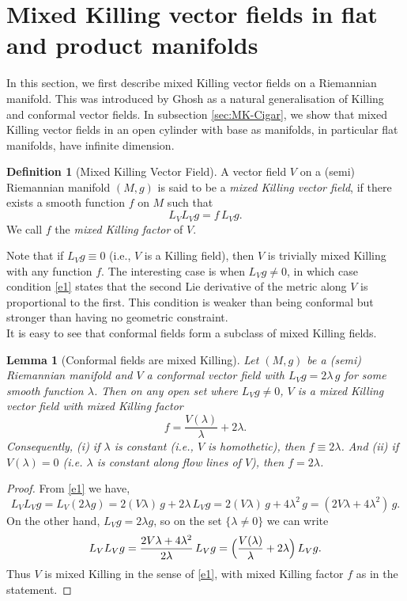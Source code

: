 \documentclass{article}
\newtheorem{lemma}{Lemma}[section]
\theoremstyle{definition}
\newtheorem{definition}{Definition}[section]
\theoremstyle{remark}
\begin{document}
\section{Mixed Killing vector fields in flat and product manifolds}\label{MKF}
In this section,  we  first describe  mixed Killing vector fields on a 
Riemannian manifold.  This was introduced by Ghosh \cite{ghosh2025mixed}
as a natural generalisation of Killing and conformal vector fields. 
In subsection \ref{sec:MK-Cigar},  we show that mixed Killing vector fields in an open cylinder with base as manifolds, in particular flat manifolds, have infinite dimension. 

\begin{definition}[Mixed Killing Vector Field]\label{def:MK}
A vector field $V$ on a (semi) Riemannian manifold $(M,g)$ is said to be a 
{\it mixed Killing vector field}, if there exists a smooth function $f$ on $M$ 
such that
\begin{equation}\label{e1}
    L_V L_V g = f\,L_V g.
\end{equation}
We call $f$ the {\it mixed Killing factor} of $V$.
\end{definition}

Note that if $L_V g \equiv 0$ (i.e., $V$ is a Killing field), then $V$ is trivially 
mixed Killing with any function $f$. The interesting case is when $L_V g \neq 0$, 
in which case condition \eqref{e1} states that the second Lie derivative 
of the metric along $V$ is proportional to the first. This condition is weaker 
than being conformal but stronger than having no geometric constraint.\\


It is easy to see that conformal fields form a subclass of mixed Killing fields.

\begin{lemma}[Conformal fields are mixed Killing]\label{lem:conformal-MK-main}
Let $(M,g)$ be a (semi) Riemannian manifold and $V$ a conformal vector field 
with  $L_V g = 2\lambda\,g$  for some smooth function $\lambda$. Then on any open set where $L_V g \neq 0$, 
$V$ is a mixed Killing vector field with mixed Killing factor
\[
f = \frac{V(\lambda)}{\lambda} + 2\lambda.
\]
Consequently, (i) if $\lambda$ is constant (i.e., $V$ is homothetic), then $f \equiv 2\lambda$. And
(ii) if $V(\lambda) = 0$ (i.e. $\lambda$ is constant along flow lines of $V$), 
then $f = 2\lambda$.
\end{lemma}
\begin{proof}
From \eqref{e1} we have,
\[
L_V L_V g
 = L_V(2\lambda g)
 = 2(V\lambda)\,g + 2\lambda\,L_V g
 = 2(V\lambda)\,g + 4\lambda^2\,g
 = (2V\lambda + 4\lambda^2)\,g.
\]
On the other hand, $L_V g = 2\lambda g$, so on the set $\{\lambda\neq 0\}$ we can write
\[
L_V L_V g
 = \frac{2V\lambda + 4\lambda^2}{2\lambda}\,L_V g
 = \Bigl(\frac{V(\lambda)}{\lambda} + 2\lambda\Bigr)\,L_V g.
\]
Thus $V$ is mixed Killing in the sense of \eqref{e1}, with mixed Killing factor
$f$ as in the statement.
\end{proof}
\end{document}
